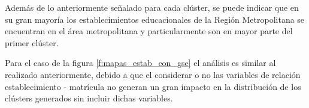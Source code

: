 Además de lo anteriormente señalado para cada clúster, se puede indicar que en su gran mayoría los establecimientos educacionales de la Región Metropolitana se encuentran en el área metropolitana y particularmente son en mayor parte del primer clúster.

Para el caso de la figura \ref{f:mapas_estab_con_gse} el análisis es similar al realizado anteriormente, debido a que el considerar o no las variables de relación establecimiento - matrícula no generan un gran impacto en la distribución de los clústers generados sin incluir dichas variables.

\begin{figure}[H]
 \centering
  \hspace{1mm}

\end{figure}
